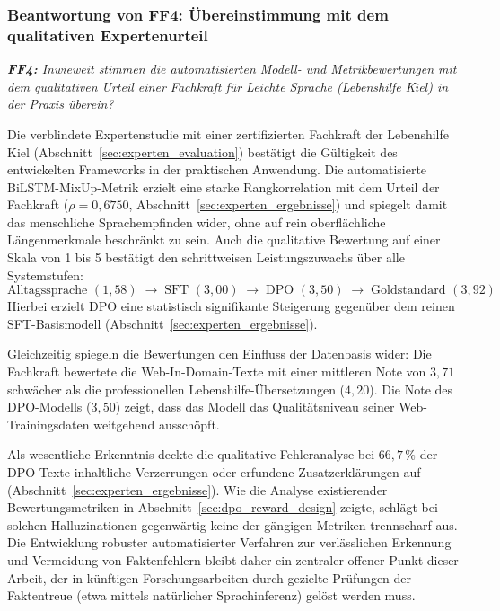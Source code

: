\subsubsection{Beantwortung von FF4: Übereinstimmung mit dem qualitativen Expertenurteil}

\begin{tcolorbox}[boxrule=0pt,sharp corners,enhanced,borderline west={2pt}{0pt}{blue}]
    \textit{\textbf{FF4:} Inwieweit stimmen die automatisierten Modell- und Metrikbewertungen mit dem qualitativen Urteil einer Fachkraft für Leichte Sprache (Lebenshilfe Kiel) in der Praxis überein?}
\end{tcolorbox}

Die verblindete Expertenstudie mit einer zertifizierten Fachkraft der Lebenshilfe Kiel (Abschnitt~\ref{sec:experten_evaluation}) bestätigt die Gültigkeit des entwickelten Frameworks in der praktischen Anwendung. Die automatisierte BiLSTM-MixUp-Metrik erzielt eine starke Rangkorrelation mit dem Urteil der Fachkraft ($\rho = 0{,}6750$, Abschnitt~\ref{sec:experten_ergebnisse}) und spiegelt damit das menschliche Sprachempfinden wider, ohne auf rein oberflächliche Längenmerkmale beschränkt zu sein. Auch die qualitative Bewertung auf einer Skala von 1 bis 5 bestätigt den schrittweisen Leistungszuwachs über alle Systemstufen:
$$\text{Alltagssprache } (1{,}58) \;\longrightarrow\; \text{SFT } (3{,}00) \;\longrightarrow\; \text{DPO } (3{,}50) \;\longrightarrow\; \text{Goldstandard } (3{,}92)$$
Hierbei erzielt DPO eine statistisch signifikante Steigerung gegenüber dem reinen SFT-Basismodell (Abschnitt~\ref{sec:experten_ergebnisse}).

Gleichzeitig spiegeln die Bewertungen den Einfluss der Datenbasis wider: Die Fachkraft bewertete die Web-In-Domain-Texte mit einer mittleren Note von $3{,}71$ schwächer als die professionellen Lebenshilfe-Übersetzungen ($4{,}20$). Die Note des DPO-Modells ($3{,}50$) zeigt, dass das Modell das Qualitätsniveau seiner Web-Trainingsdaten weitgehend ausschöpft. 

Als wesentliche Erkenntnis deckte die qualitative Fehleranalyse bei $66{,}7\,\%$ der DPO-Texte inhaltliche Verzerrungen oder erfundene Zusatzerklärungen auf (Abschnitt~\ref{sec:experten_ergebnisse}). Wie die Analyse existierender Bewertungsmetriken in Abschnitt~\ref{sec:dpo_reward_design} zeigte, schlägt bei solchen Halluzinationen gegenwärtig keine der gängigen Metriken trennscharf aus. Die Entwicklung robuster automatisierter Verfahren zur verlässlichen Erkennung und Vermeidung von Faktenfehlern bleibt daher ein zentraler offener Punkt dieser Arbeit, der in künftigen Forschungsarbeiten durch gezielte Prüfungen der Faktentreue (etwa mittels natürlicher Sprachinferenz) gelöst werden muss.

